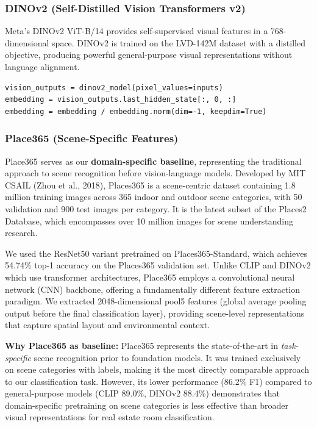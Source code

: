 \documentclass[conference]{IEEEtran}
\begin{document}
\subsubsection{DINOv2 (Self-Distilled Vision Transformers v2)}
Meta's DINOv2 ViT-B/14 provides self-supervised visual features in a 768-dimensional space. DINOv2 is trained on the LVD-142M dataset with a distilled objective, producing powerful general-purpose visual representations without language alignment.

\begin{verbatim}
vision_outputs = dinov2_model(pixel_values=inputs)
embedding = vision_outputs.last_hidden_state[:, 0, :]
embedding = embedding / embedding.norm(dim=-1, keepdim=True)
\end{verbatim}

\subsubsection{Place365 (Scene-Specific Features)}
Place365 serves as our \textbf{domain-specific baseline}, representing the traditional approach to scene recognition before vision-language models. Developed by MIT CSAIL (Zhou et al., 2018), Places365 is a scene-centric dataset containing 1.8 million training images across 365 indoor and outdoor scene categories, with 50 validation and 900 test images per category. It is the latest subset of the Places2 Database, which encompasses over 10 million images for scene understanding research.

We used the ResNet50 variant pretrained on Places365-Standard, which achieves 54.74\% top-1 accuracy on the Places365 validation set. Unlike CLIP and DINOv2 which use transformer architectures, Place365 employs a convolutional neural network (CNN) backbone, offering a fundamentally different feature extraction paradigm. We extracted 2048-dimensional pool5 features (global average pooling output before the final classification layer), providing scene-level representations that capture spatial layout and environmental context.

\textbf{Why Place365 as baseline:} Place365 represents the state-of-the-art in \textit{task-specific} scene recognition prior to foundation models. It was trained exclusively on scene categories with labels, making it the most directly comparable approach to our classification task. However, its lower performance (86.2\% F1) compared to general-purpose models (CLIP 89.0\%, DINOv2 88.4\%) demonstrates that domain-specific pretraining on scene categories is less effective than broader visual representations for real estate room classification.
\end{document}
